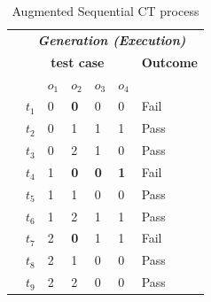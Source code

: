 \documentclass[10pt,journal,compsoc]{IEEEtran}
\begin{document}
\begin{table}[h]
\caption{Augmented Sequential CT process}
\label{tradition-gi-aug}
\centering
\begin{tabular}{lllllll}
                                       & \multicolumn{6}{c}{\bfseries \emph{Generation (Execution)}}                                                                                                                                                                                                                                  \\ \cline{2-7}
                                       & \multicolumn{5}{c|}{\bfseries test case}                                                                                                                                                                                                              & \bfseries Outcome \\
                                       & &$o_{1}$ & $o_{2}$& $o_{3}$& \multicolumn{1}{c|}{$o_{4}$}&  \\    \cline{2-7}
                                       & \multicolumn{1}{l|}{$t_{1}$}   & 0& \textbf{0}& 0& \multicolumn{1}{l|}{0}     & Fail              \\
                                       & \multicolumn{1}{l|}{$t_{2}$}   & 0& 1& 1& \multicolumn{1}{l|}{1}     & Pass              \\
                                       & \multicolumn{1}{l|}{$t_{3}$}   & 0& 2& 1& \multicolumn{1}{l|}{0}     & Pass              \\
                                       & \multicolumn{1}{l|}{$t_{4}$}   & 1& \textbf{0}& \textbf{0}& \multicolumn{1}{l|}{\textbf{1}}     & Fail              \\
                                       & \multicolumn{1}{l|}{$t_{5}$}   & 1& 1& 0& \multicolumn{1}{l|}{0}     & Pass              \\
                                       & \multicolumn{1}{l|}{$t_{6}$}   & 1& 2& 1& \multicolumn{1}{l|}{1}     & Pass              \\
                                       & \multicolumn{1}{l|}{$t_{7}$}   & 2& \textbf{0}& 1& \multicolumn{1}{l|}{1}     & Fail              \\
                                       & \multicolumn{1}{l|}{$t_{8}$}   & 2& 1& 0& \multicolumn{1}{l|}{0}     & Pass              \\
                                       & \multicolumn{1}{l|}{$t_{9}$}   & 2& 2& 0& \multicolumn{1}{l|}{0}     & Pass              \\ \cline{2-7}

\end{tabular}
\end{table}
\end{document}
